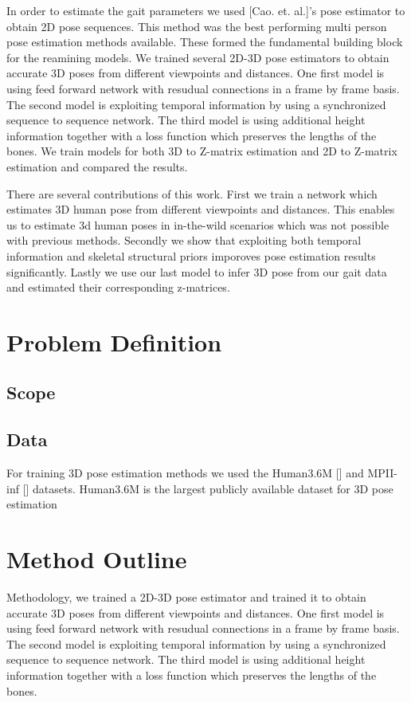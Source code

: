 In order to estimate the gait parameters we used [Cao. et. al.]'s pose estimator to obtain 2D pose sequences. This method was the best performing multi person pose estimation methods available. These formed the fundamental building block for the reamining models. We trained several 2D-3D pose estimators to obtain accurate 3D poses from different viewpoints and distances. One first model is using feed forward network with resudual connections in a frame by frame basis. The second model is exploiting temporal information by using a synchronized sequence to sequence network. The third model is using additional height information together with a loss function which preserves the lengths of the bones. We train models for both 3D to Z-matrix estimation and 2D to Z-matrix estimation and compared the results.

There are several contributions of this work. First we train a network which estimates 3D human pose from different viewpoints and distances. This enables us to estimate 3d human poses in in-the-wild  scenarios which was not possible with previous methods. Secondly we show that exploiting both  temporal information and skeletal structural priors imporoves pose estimation results significantly. Lastly we use our last model to infer 3D pose from our gait data and estimated their corresponding z-matrices.

\section{Problem Definition}

\subsection{Scope}

\subsection{Data}

For training 3D pose estimation methods we used the Human3.6M [] and MPII-inf [] datasets. Human3.6M is the largest publicly available dataset for 3D pose estimation

\section{Method Outline}

Methodology, we trained a 2D-3D pose estimator and trained it to obtain accurate 3D poses
from different viewpoints and distances. One first model is using feed forward network with 
resudual connections in a frame by frame basis. The second model is exploiting temporal information
by using a synchronized sequence to sequence network. The third model is using additional height 
information together with a loss function which preserves the lengths of the bones.

